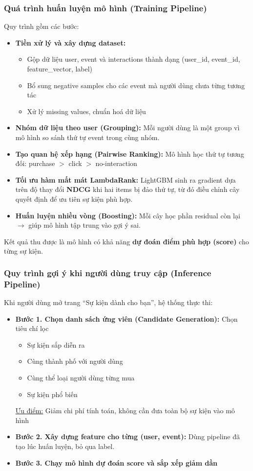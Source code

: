 \subsubsection{Quá trình huấn luyện mô hình (Training Pipeline)}
\indent \indent Quy trình gồm các bước:
\begin{itemize}
    \item[1.] \textbf{Tiền xử lý và xây dựng dataset:}
    \begin{itemize}
        \item[-] Gộp dữ liệu user, event và interactions thành dạng (user\_id, event\_id, feature\_vector, label)
        \item[-] Bổ sung negative samples cho các event mà người dùng chưa từng tương tác
        \item[-] Xử lý missing values, chuẩn hoá dữ liệu
    \end{itemize}
    \item[2.] \textbf{Nhóm dữ liệu theo user (Grouping):} Mỗi người dùng là một group vì mô hình so sánh thứ tự event trong cùng nhóm.
    \item[3.] \textbf{Tạo quan hệ xếp hạng (Pairwise Ranking):} Mô hình học thứ tự tương đối: purchase $>$ click $>$ no-interaction
    \item[4.] \textbf{Tối ưu hàm mất mát LambdaRank:} LightGBM sinh ra gradient dựa trên độ thay đổi \textbf{NDCG} khi hai items bị đảo thứ tự, từ đó điều chỉnh cây quyết định để ưu tiên sự kiện phù hợp.
    \item[5.] \textbf{Huấn luyện nhiều vòng (Boosting):} Mỗi cây học phần residual còn lại $\rightarrow$ giúp mô hình tập trung vào gợi ý sai.
\end{itemize}
\indent \indent Kết quả thu được là mô hình có khả năng \textbf{dự đoán điểm phù hợp (score)} cho từng sự kiện.
\subsubsection{Quy trình gợi ý khi người dùng truy cập (Inference Pipeline)}
\indent \indent Khi người dùng mở trang “Sự kiện dành cho bạn”, hệ thống thực thi:
\begin{itemize}
    \item[] \textbf{Bước 1. Chọn danh sách ứng viên (Candidate Generation):} Chọn tiêu chí lọc
    \begin{itemize}
        \item[-] Sự kiện sắp diễn ra
        \item[-] Cùng thành phố với người dùng
        \item[-] Cùng thể loại người dùng từng mua
        \item[-] Sự kiện phổ biến
    \end{itemize}
    \underline{Ưu điểm:} Giảm chi phí tính toán, không cần đưa toàn bộ sự kiện vào mô hình
    \item[] \textbf{Bước 2. Xây dựng feature cho từng (user, event):} Dùng pipeline đã tạo lúc huấn luyện, bỏ qua label.
    \item[] \textbf{Bước 3. Chạy mô hình dự đoán score và sắp xếp giảm dần}
\end{itemize}
